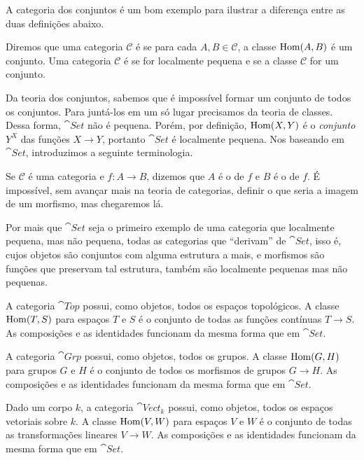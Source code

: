 A categoria dos conjuntos é um bom exemplo para ilustrar a diferença entre as duas definições abaixo.

\begin{definicao}
    Diremos que uma categoria $\mathcal{C}$ é  se para cada $A, B \in \mathcal{C}$, a classe $\operatorname{Hom}(A,B)$ é um conjunto. Uma categoria $\mathcal{C}$ é  se for localmente pequena e se a classe $\mathcal{C}$ for um conjunto.
\end{definicao}

Da teoria dos conjuntos, sabemos que é impossível formar um conjunto de todos os conjuntos. Para juntá-los em um só lugar precisamos da teoria de classes. Dessa forma, $\cat{Set}$ não é pequena. Porém, por definição, $\operatorname{Hom}(X,Y)$ é o \textit{conjunto} $Y^X$ das funções $X \to Y$, portanto $\cat{Set}$ é localmente pequena. Nos baseando em $\cat{Set}$, introduzimos a seguinte terminologia.

\begin{definicao}
    Se $\mathcal{C}$ é uma categoria e $f \colon A \to B$, dizemos que $A$ é o  de $f$ e $B$ é o  de $f$. É impossível, sem avançar mais na teoria de categorias, definir o que seria a imagem de um morfismo, mas chegaremos lá.
\end{definicao}

Por mais que $\cat{Set}$ seja o primeiro exemplo de uma categoria que localmente pequena, mas não pequena, todas as categorias que ``derivam'' de $\cat{Set}$, isso é, cujos objetos são conjuntos com alguma estrutura a mais, e morfismos são funções que preservam tal estrutura, também são localmente pequenas mas não pequenas.

\begin{exemplo}
    A categoria $\cat{Top}$ possui, como objetos, todos os espaços topológicos. A classe $\operatorname{Hom}(T, S)$ para espaços $T$ e $S$ é o conjunto de todas as funções contínuas $T \to S$. As composições e as identidades funcionam da mesma forma que em $\cat{Set}$.
\end{exemplo}

\begin{exemplo}
    A categoria $\cat{Grp}$ possui, como objetos, todos os grupos. A classe $\operatorname{Hom}(G, H)$ para grupos $G$ e $H$ é o conjunto de todos os morfismos de grupos $G \to H$. As composições e as identidades funcionam da mesma forma que em $\cat{Set}$.
\end{exemplo}

\begin{exemplo}
    Dado um corpo $k$, a categoria $\cat{Vect}_k$ possui, como objetos, todos os espaços vetoriais sobre $k$. A classe $\operatorname{Hom}(V, W)$ para espaços $V$ e $W$ é o conjunto de todas as transformações lineares $V \to W$. As composições e as identidades funcionam da mesma forma que em $\cat{Set}$.
\end{exemplo}


